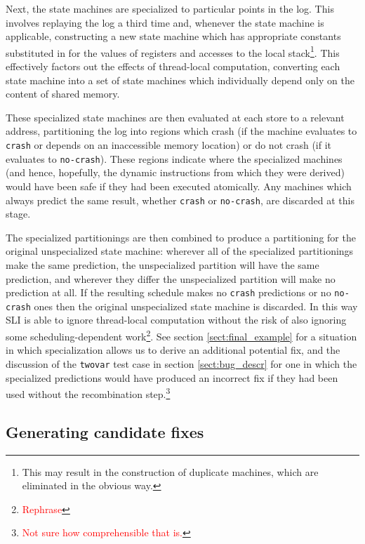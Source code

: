 \documentclass[10pt,twocolumn,preprint,natbib,authoryear]{sigplanconf}
\newcommand{\editorial}[1]{\textcolor{red}{\footnote{\textcolor{red}{#1}}}}
\begin{document}
Next, the state machines are specialized to particular points in the
log.  This involves replaying the log a third time and, whenever the
state machine is applicable, constructing a new state machine which
has appropriate constants substituted in for the values of registers
and accesses to the local stack\footnote{This may result in the
  construction of duplicate machines, which are eliminated in the
  obvious way.}.  This effectively factors out the effects of
thread-local computation, converting each state machine into a set of
state machines which individually depend only on the content of shared
memory.

These specialized state machines are then evaluated at each store to a
relevant address, partitioning the log into regions which crash (if
the machine evaluates to \verb|crash| or depends on an inaccessible
memory location) or do not crash (if it evaluates to \verb|no-crash|).
These regions indicate where the specialized machines (and hence,
hopefully, the dynamic instructions from which they were derived)
would have been safe if they had been executed atomically.  Any
machines which always predict the same result, whether \verb|crash| or
\verb|no-crash|, are discarded at this stage.

The specialized partitionings are then combined to produce a
partitioning for the original unspecialized state machine: wherever
all of the specialized partitionings make the same prediction, the
unspecialized partition will have the same prediction, and wherever
they differ the unspecialized partition will make no prediction at
all.  If the resulting schedule makes no \verb|crash| predictions or
no \verb|no-crash| ones then the original unspecialized state machine
is discarded.  In this way SLI is able to ignore thread-local
computation without the risk of also ignoring some
scheduling-dependent work\editorial{Rephrase}.  See section
\ref{sect:final_example} for a situation in which specialization
allows us to derive an additional potential fix, and the discussion of
the \verb|twovar| test case in section \ref{sect:bug_descr} for one in
which the specialized predictions would have produced an incorrect fix
if they had been used without the recombination step.\editorial{Not
  sure how comprehensible that is.}

\subsection{Generating candidate fixes}
\label{sect:gen_fix}
\end{document}
